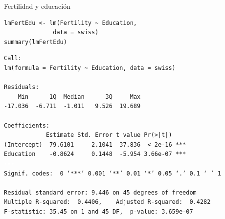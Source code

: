 \documentclass[xcolor={usenames,svgnames,dvipsnames}]{beamer}
\begin{document}
\begin{frame}[fragile,label=sec-5-1]{Fertilidad y educación}
 \lstset{language=R,label= ,caption= ,numbers=none}
\begin{lstlisting}
lmFertEdu <- lm(Fertility ~ Education,
              data = swiss)
summary(lmFertEdu)
\end{lstlisting}

\begin{verbatim}
Call:
lm(formula = Fertility ~ Education, data = swiss)

Residuals:
    Min      1Q  Median      3Q     Max 
-17.036  -6.711  -1.011   9.526  19.689 

Coefficients:
            Estimate Std. Error t value Pr(>|t|)    
(Intercept)  79.6101     2.1041  37.836  < 2e-16 ***
Education    -0.8624     0.1448  -5.954 3.66e-07 ***
---
Signif. codes:  0 ‘***’ 0.001 ‘**’ 0.01 ‘*’ 0.05 ‘.’ 0.1 ‘ ’ 1

Residual standard error: 9.446 on 45 degrees of freedom
Multiple R-squared:  0.4406,	Adjusted R-squared:  0.4282 
F-statistic: 35.45 on 1 and 45 DF,  p-value: 3.659e-07
\end{verbatim}
\end{frame}
\end{document}

